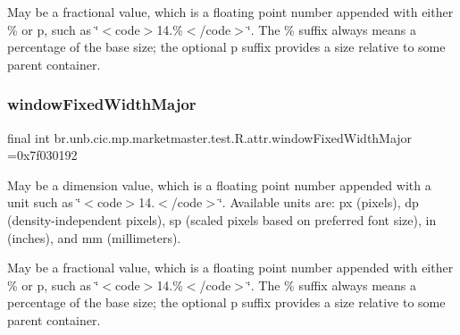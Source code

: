 May be a fractional value, which is a floating point number appended with either \% or p, such as \char`\"{}$<$code$>$14.\%$<$/code$>$\char`\"{}. The \% suffix always means a percentage of the base size; the optional p suffix provides a size relative to some parent container. \mbox{\label{classbr_1_1unb_1_1cic_1_1mp_1_1marketmaster_1_1test_1_1R_1_1attr_a119fef431afa59f408bee71b0c3f787a}} 
\subsubsection{\texorpdfstring{window\+Fixed\+Width\+Major}{windowFixedWidthMajor}}
{\footnotesize\ttfamily final int br.\+unb.\+cic.\+mp.\+marketmaster.\+test.\+R.\+attr.\+window\+Fixed\+Width\+Major =0x7f030192\hspace{0.3cm}{\ttfamily [static]}}

May be a dimension value, which is a floating point number appended with a unit such as \char`\"{}$<$code$>$14.\+5sp$<$/code$>$\char`\"{}. Available units are\+: px (pixels), dp (density-\/independent pixels), sp (scaled pixels based on preferred font size), in (inches), and mm (millimeters). 

May be a fractional value, which is a floating point number appended with either \% or p, such as \char`\"{}$<$code$>$14.\%$<$/code$>$\char`\"{}. The \% suffix always means a percentage of the base size; the optional p suffix provides a size relative to some parent container. \mbox{\label{classbr_1_1unb_1_1cic_1_1mp_1_1marketmaster_1_1test_1_1R_1_1attr_aa1cb1a129c84de346409f06385e2f66c}} 
